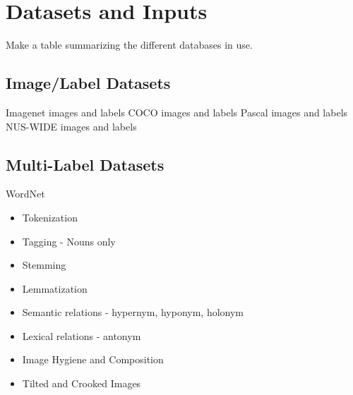 \documentclass[10pt, a4paper, twocolumn]{article} %
\begin{document}
\section{Datasets and Inputs} %

Make a table summarizing the different databases in use.


\subsection{Image/Label Datasets}

Imagenet images and labels
COCO images and labels
Pascal images and labels
NUS-WIDE images and labels

\subsection{Multi-Label Datasets}

WordNet

\begin{itemize}
	\item Tokenization
	\item Tagging - Nouns only
	\item Stemming
	\item Lemmatization
	\item Semantic relations - hypernym, hyponym, holonym
	\item Lexical relations - antonym
	\item Image Hygiene and Composition
	\item Tilted and Crooked Images
\end{itemize}
\end{document}
